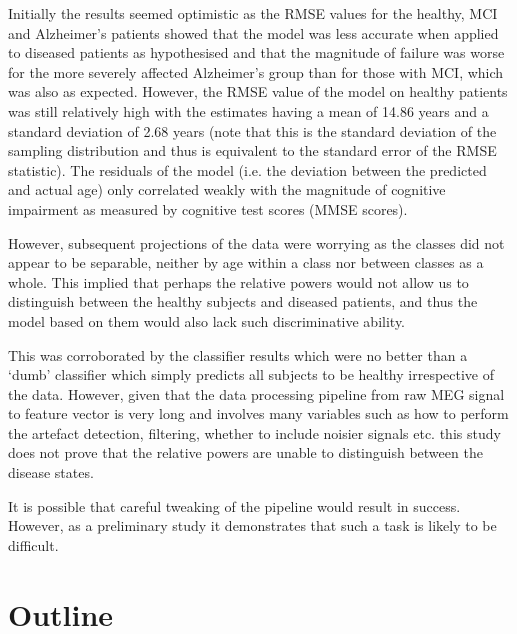 Initially the results seemed optimistic as the RMSE values for the healthy, MCI and Alzheimer's patients showed that the model was less accurate when applied to diseased patients as hypothesised and that the magnitude of failure was worse for the more severely affected Alzheimer's group than for those with MCI, which was also as expected. However, the RMSE value of the model on healthy patients was still relatively high with the estimates having a mean of 14.86 years and a standard deviation of 2.68 years (note that this is the standard deviation of the sampling distribution and thus is equivalent to the standard error of the RMSE statistic). The residuals of the model (i.e. the deviation between the predicted and actual age) only correlated weakly with the magnitude of cognitive impairment as measured by cognitive test scores (MMSE scores).

However, subsequent projections of the data were worrying as the classes did not appear to be separable, neither by age within a class nor between classes as a whole. This implied that perhaps the relative powers would not allow us to distinguish between the healthy subjects and diseased patients, and thus the model based on them would also lack such discriminative ability. 

This was corroborated by the classifier results which were no better than a `dumb' classifier which simply predicts all subjects to be healthy irrespective of the data. However, given that the data processing pipeline from raw MEG signal to feature vector is very long and involves many variables such as how to perform the artefact detection, filtering, whether to include noisier signals etc. this study does not prove that the relative powers are unable to distinguish between the disease states.

It is possible that careful tweaking of the pipeline would result in success. However, as a preliminary study it demonstrates that such a task is likely to be difficult.



\newpage

\section{Outline}


